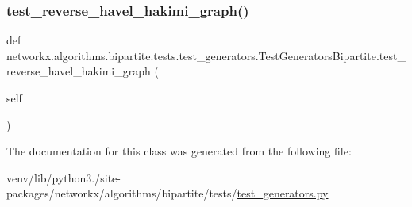 \subsubsection{\texorpdfstring{test\+\_\+reverse\+\_\+havel\+\_\+hakimi\+\_\+graph()}{test\_reverse\_havel\_hakimi\_graph()}}
{\footnotesize\ttfamily def networkx.\+algorithms.\+bipartite.\+tests.\+test\+\_\+generators.\+Test\+Generators\+Bipartite.\+test\+\_\+reverse\+\_\+havel\+\_\+hakimi\+\_\+graph (\begin{DoxyParamCaption}\item[{}]{self }\end{DoxyParamCaption})}



The documentation for this class was generated from the following file\+:\begin{DoxyCompactItemize}
\item 
venv/lib/python3./site-\/packages/networkx/algorithms/bipartite/tests/\hyperlink{test__generators_8py}{test\+\_\+generators.\+py}\end{DoxyCompactItemize}
